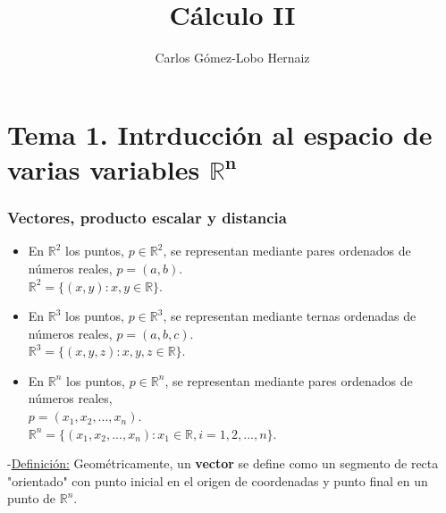 \documentclass[10pt, titlepage]{article}
\begin{document}
\title {Cálculo II}
\author {Carlos Gómez-Lobo Hernaiz}
\date{}
\maketitle


\part* {Tema 1. Intrducción al espacio de varias variables $\displaystyle \mathbf{\mathbb{R}^n}$}

\section {Vectores, producto escalar y distancia}

\begin{itemize}

\item En $\displaystyle \mathbb{R}^2$ los puntos, $p \in \displaystyle \mathbb{R}^2$, se representan mediante pares ordenados de números reales, $p=(a, b)$. \\$\mathbb{R}^2 = \{(x, y):x, y \in \mathbb{R}\}$.

\item En $\displaystyle \mathbb{R}^3$ los puntos, $p \in\displaystyle  \mathbb{R}^3$, se representan mediante ternas ordenadas de números reales, $p=(a, b, c)$. \\$\displaystyle \mathbb{R}^3 = \{(x, y, z):x, y, z \in \displaystyle \mathbb{R}\}$.

\item En $\mathbb{R}^n$ los puntos, $p \in \displaystyle \mathbb{R}^n$, se representan mediante pares ordenados de números reales, \\ $p=(x_1, x_2, ..., x_n)$.\\ $\displaystyle \mathbb{R}^n = \{(x_1, x_2, ..., 
x_n):x_1 \in \displaystyle \mathbb{R}, i=1, 2, ..., n\}$.
\vspace{3mm}

\end{itemize}

\noindent -\underline{Definición:} Geométricamente, un \textbf{vector} se define como un segmento de recta "orientado" con punto inicial en el origen de coordenadas y punto final en un punto de $\displaystyle \mathbb{R}^n$.

\vspace{5mm}
\end{document}
